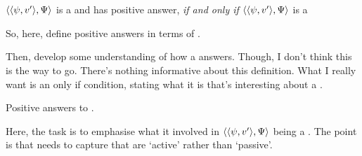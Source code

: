 \section{}
\label{cha:fcs:sec:fc}

\begin{note}
  \begin{definition}
    \(\langle \langle \psi, v' \rangle, \Psi \rangle\) is a \requ{} and \qzS{} has positive answer, \emph{if and only if} \(\langle \langle \psi, v' \rangle, \Psi \rangle\) is a \fc{}
  \end{definition}
  So, here, define positive answers in terms of \fc{}.

  Then, develop some understanding of how a \fc{} answers.
  Though, I don't think this is the way to go.
  There's nothing informative about this definition.
  What I really want is an only if condition, stating what it is that's interesting about a \fc{}.
\end{note}

\begin{note}
  Positive answers to \qzS{}.

  Here, the task is to emphasise what it involved in \(\langle \langle \psi, v' \rangle, \Psi \rangle\) being a \fc{}.
  The point is that \fc{} needs to capture that \fc{} are `active' rather than `passive'.
\end{note}


